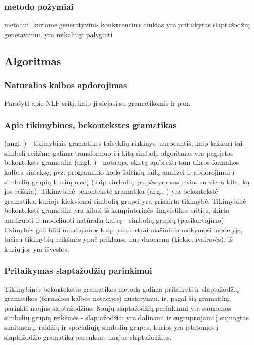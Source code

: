 \documentclass{VUMIFInfBakalaurinis}
\begin{document}
\subsubsection{ metodo požymiai}
 metodui, kuriame generatyvinis konkurencinis tinklas yra 
pritaikytas slaptažodžių generavimui, yra reikalingi palyginti 


\cite{DBLP:journals/corr/abs-1709-00440}

\subsection{ Algoritmas}
\subsubsection{Natūralios kalbos apdorojimas}
Parašyti apie NLP sritį, kaip ji siejasi su gramatikomis ir pan.

\subsubsection{Apie tikimybines, bekontekstes gramatikas}
 (angl. ) - 
tikimybinis gramatikos taisyklių rinkinys, nurodantis, kaip kažkurį tai 
simbolį-reikšmę galima transformuoti į kitą simbolį.  algoritmas 
yra pagrįstas bekontekste gramatika (angl. ) - 
notacija, skirtą apibrėžti tam tikros formalios kalbos sintaksę, pvz. 
programinio kodo šaltinių failų analizei ir apdorojimui į simbolių grupių 
leksinį medį (kaip simbolių grupės yra susijusios su viena kita, ką jos 
reiškia). Tikimybinė bekontekstė gramatika (angl. ) yra bekontekstė gramatika, kurioje kiekvienai simbolių 
grupei yra priskirta tikimybė. Tikimybinė bekontekstė gramatika yra kilusi iš 
kompiuterinės lingvistikos srities, skirta analizuoti ir modeliuoti natūralią 
kalbą - simbolių grupių (pasikartojimo) tikimybės gali būti naudojamos kaip 
parametrai mašininio mokymosi modelyje, tačiau tikimybių reikšmės ypač priklauso 
nuo duomenų (kiekio, įvairovės), iš kurių jos yra išvestos.

\subsubsection{Pritaikymas slaptažodžių parinkimui}
Tikimybinės bekontekstės gramatikos metodą galima pritaikyti ir slaptažodžių 
gramatikos (formalios kalbos notacijos) nustatymui, ir, pagal šią gramatiką, 
parinkti naujus slaptažodžius. Naujų slaptažodžių parinkimui yra saugomos 
simbolių grupių reikšmės - slaptažodžiai yra dalinami ir sugrupuojami į 
sujungtas skaitmenų, raidžių ir specialiųjų simbolių grupes, kurios yra 
įstatomos į slaptažodžio gramatiką parenkant naujus slaptažodžius.
\end{document}
